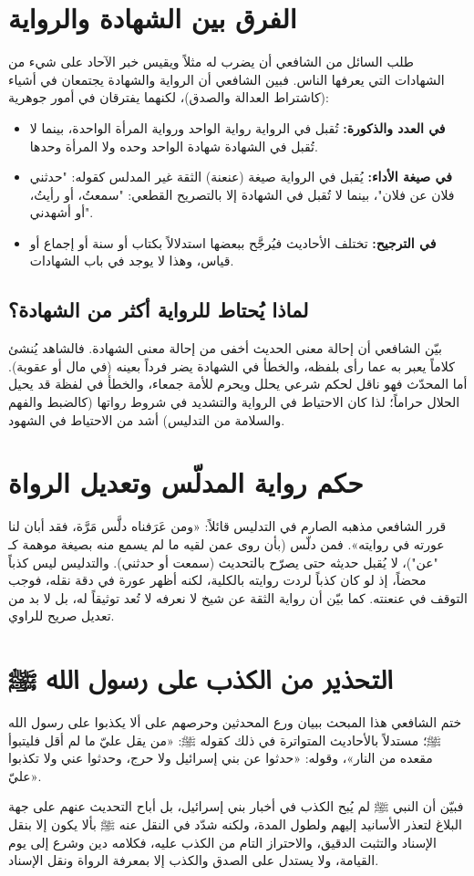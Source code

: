 \section{الفرق بين الشهادة والرواية}
طلب السائل من الشافعي أن يضرب له مثلاً ويقيس خبر الآحاد على شيء من الشهادات التي يعرفها الناس. فبين الشافعي أن الرواية والشهادة يجتمعان في أشياء (كاشتراط العدالة والصدق)، لكنهما يفترقان في أمور جوهرية:
\begin{itemize}
    \item \textbf{في العدد والذكورة:} تُقبل في الرواية رواية الواحد ورواية المرأة الواحدة، بينما لا تُقبل في الشهادة شهادة الواحد وحده ولا المرأة وحدها.
    \item \textbf{في صيغة الأداء:} يُقبل في الرواية صيغة (عنعنة) الثقة غير المدلس كقوله: "حدثني فلان عن فلان"، بينما لا تُقبل في الشهادة إلا بالتصريح القطعي: "سمعتُ، أو رأيتُ، أو أشهدني".
    \item \textbf{في الترجيح:} تختلف الأحاديث فيُرجَّح ببعضها استدلالاً بكتاب أو سنة أو إجماع أو قياس، وهذا لا يوجد في باب الشهادات.
\end{itemize}

\subsection{لماذا يُحتاط للرواية أكثر من الشهادة؟}
بيّن الشافعي أن إحالة معنى الحديث أخفى من إحالة معنى الشهادة. فالشاهد يُنشئ كلاماً يعبر به عما رأى بلفظه، والخطأ في الشهادة يضر فرداً بعينه (في مال أو عقوبة). أما المحدّث فهو ناقل لحكم شرعي يحلل ويحرم للأمة جمعاء، والخطأ في لفظة قد يحيل الحلال حراماً؛ لذا كان الاحتياط في الرواية والتشديد في شروط رواتها (كالضبط والفهم والسلامة من التدليس) أشد من الاحتياط في الشهود.

\section{حكم رواية المدلّس وتعديل الرواة}
قرر الشافعي مذهبه الصارم في التدليس قائلاً: «ومن عَرَفناه دلَّس مَرَّة، فقد أبان لنا عورته في روايته». فمن دلّس (بأن روى عمن لقيه ما لم يسمع منه بصيغة موهمة كـ "عن")، لا يُقبل حديثه حتى يصرّح بالتحديث (سمعت أو حدثني). والتدليس ليس كذباً محضاً، إذ لو كان كذباً لردت روايته بالكلية، لكنه أظهر عورة في دقة نقله، فوجب التوقف في عنعنته.
كما بيّن أن رواية الثقة عن شيخ لا نعرفه لا تُعد توثيقاً له، بل لا بد من تعديل صريح للراوي.

\section{التحذير من الكذب على رسول الله ﷺ}
ختم الشافعي هذا المبحث ببيان ورع المحدثين وحرصهم على ألا يكذبوا على رسول الله ﷺ؛ مستدلاً بالأحاديث المتواترة في ذلك كقوله ﷺ: «من يقل عليّ ما لم أقل فليتبوأ مقعده من النار»، وقوله: «حدثوا عن بني إسرائيل ولا حرج، وحدثوا عني ولا تكذبوا عليّ».

فبيّن أن النبي ﷺ لم يُبح الكذب في أخبار بني إسرائيل، بل أباح التحديث عنهم على جهة البلاغ لتعذر الأسانيد إليهم ولطول المدة، ولكنه شدّد في النقل عنه ﷺ بألا يكون إلا بنقل الإسناد والتثبت الدقيق، والاحتراز التام من الكذب عليه، فكلامه دين وشرع إلى يوم القيامة، ولا يستدل على الصدق والكذب إلا بمعرفة الرواة ونقل الإسناد.